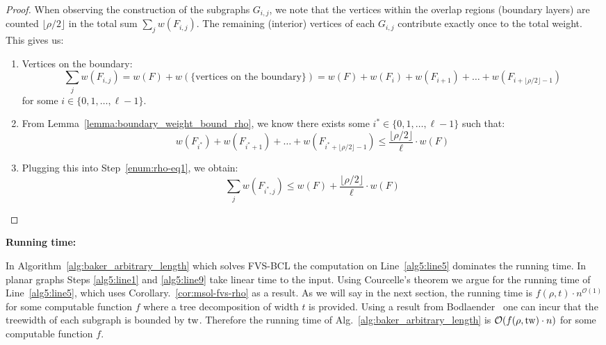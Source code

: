 \begin{proof}

When observing the construction of the subgraphs \( G_{i, j} \), we note that the vertices within the overlap regions
(boundary layers) are counted $\lfloor \rho / 2 \rfloor$ in the total sum \( \sum\limits_{j} w(F_{i, j}) \). The remaining (interior)
vertices of each \( G_{i, j} \) contribute exactly once to the total weight. This gives us:

\begin{enumerate}
    \item Vertices on the boundary: \[
        \sum\limits_{j} w(F_{i, j}) = w(F) + w(\{\text{vertices on the boundary}\}) = 
        w(F) + w(F_i) + w(F_{i+1}) + \dots + w(F_{i+\lfloor \rho/2 \rfloor - 1})
    \]
    for some \( i \in \{0, 1, \dots, \ell - 1\} \). \label{enum:rho-eq1}
    
    \item From Lemma~\ref{lemma:boundary_weight_bound_rho}, we know there exists some \( i^* \in \{0, 1, \dots, \ell - 1\} \) such that:
    \[
        w(F_{i^*}) + w(F_{i^* + 1}) + \dots + w(F_{i^* + \lfloor \rho/2 \rfloor - 1}) \leq \frac{\lfloor \rho/2 \rfloor}{\ell} \cdot w(F)
    \]
    
    \item Plugging this into Step~\ref{enum:rho-eq1}, we obtain:
    \[
        \sum\limits_{j} w(F_{i^*, j}) \leq w(F) + \frac{\lfloor \rho/2 \rfloor}{\ell} \cdot w(F)
    \]
\end{enumerate}

\end{proof}


\textbf{Running time:}

In Algorithm~\ref{alg:baker_arbitrary_length} which solves FVS-BCL the computation on Line~\ref{alg5:line5}
dominates the running time. In planar graphs Steps \ref{alg5:line1} and \ref{alg5:line9} take linear time 
to the input. Using Courcelle's theorem \cite{courcelle1990monadic} we argue for the running time 
of Line~\ref{alg5:line5}, which uses Corollary.~\ref{cor:msol-fvs-rho} as a result. As we will say in the next 
section, the running time is $f(\rho, t) \cdot n^{\mathcal{O}(1)}$ for some computable function $f$ 
where a tree decomposition of width $t$ is provided. Using a result from Bodlaender~\cite[Theorem 83]{bodlaender1998partial}
one can incur that the treewidth of each subgraph is bounded by $\operatorname{tw}$. Therefore the running time of Alg.~\ref{alg:baker_arbitrary_length} 
is $\mathcal{O}(f(\rho, \operatorname{tw}) \cdot n)$ for some computable function $f$.
